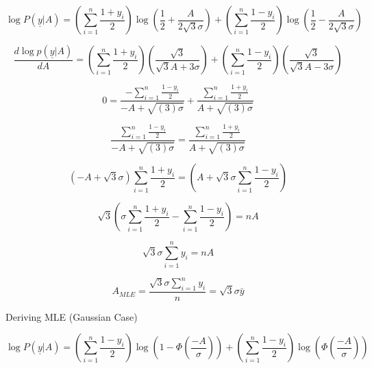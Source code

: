 \documentclass{amsart}
\begin{document}
\begin{equation}
\log P(\underline{y}|A) = \left(\sum_{i=1}^{n}\frac{1+y_i}{2}\right)\log\left( \frac{1}{2} + \frac{A}{2\sqrt{3}\sigma} \right) + \left(\sum_{i=1}^{n}\frac{1-y_i}{2}\right)\log\left( \frac{1}{2} - \frac{A}{2\sqrt{3}\sigma} \right)
\end{equation}

\begin{equation}
\frac{d\log p(\underline{y} | A)}{dA} = \left(\sum_{i=1}^{n}\frac{1+y_i}{2}\right)\left( \frac{\sqrt{3}}{\sqrt{3}A + 3\sigma} \right) + \left(\sum_{i=1}^{n}\frac{1-y_i}{2}\right)\left( \frac{\sqrt{3}}{\sqrt{3}A - 3\sigma} \right)
\end{equation}



\begin{equation}
0 = \frac{-\sum_{i=1}^{n} \frac{1-y_i}{2}}{-A+\sqrt{(3)\sigma}} + \frac{\sum_{i=1}^{n} \frac{1+y_i}{2}}{A+\sqrt{(3)\sigma}}
\end{equation}

\begin{equation}
\frac{\sum_{i=1}^{n} \frac{1-y_i}{2}}{-A+\sqrt{(3)\sigma}} = \frac{\sum_{i=1}^{n} \frac{1+y_i}{2}}{A+\sqrt{(3)\sigma}}
\end{equation}

\begin{equation}
(-A+\sqrt{3}\sigma)\sum_{i=1}^{n} \frac{1+y_i}{2} = (A+\sqrt{3}\sigma \sum_{i=1}^{n} \frac{1-y_i}{2})
\end{equation}

\begin{equation}
\sqrt{3}\left(\sigma\sum_{i=1}^{n} \frac{1+y_i}{2} - \sum_{i=1}^{n} \frac{1-y_i}{2}\right) = nA
\end{equation}

\begin{equation}
\sqrt{3}\sigma\sum_{i=1}^{n}y_i = nA
\end{equation}

\begin{equation}
A_{MLE} = \frac{\sqrt{3}\sigma\sum_{i=1}^{n}y_i}{n} = \sqrt{3}\sigma\bar{y}
\end{equation}

\newpage



Deriving MLE (Gaussian Case)

\begin{equation}
\log P(\underline{y}|A) = \left( \sum_{i=1}^{n}\frac{1-y_i}{2} \right) \log(1-\Phi(\frac{-A}{\sigma})) + \left( \sum_{i=1}^{n}\frac{1-y_i}{2} \right)  \log(\Phi(\frac{-A}{\sigma}))
\end{equation}
\end{document}
